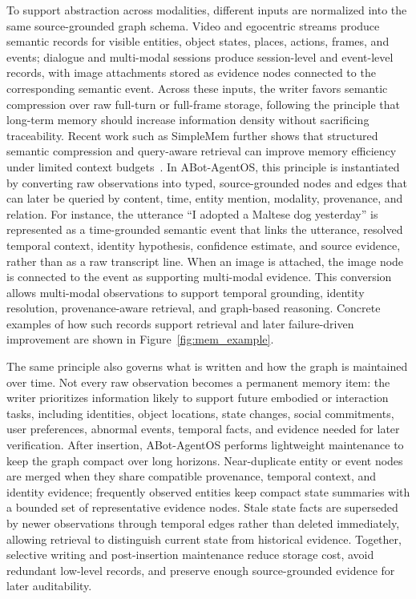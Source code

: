 To support abstraction across modalities, different inputs are normalized into the same source-grounded graph schema.
Video and egocentric streams produce semantic records for visible entities, object states, places, actions, frames, and events; dialogue and multi-modal sessions produce session-level and event-level records, with image attachments stored as evidence nodes connected to the corresponding semantic event.
Across these inputs, the writer favors semantic compression over raw full-turn or full-frame storage, following the principle that long-term memory should increase information density without sacrificing traceability.
Recent work such as SimpleMem further shows that structured semantic compression and query-aware retrieval can improve memory efficiency under limited context budgets~\cite{simplemem}.
In ABot-AgentOS, this principle is instantiated by converting raw observations into typed, source-grounded nodes and edges that can later be queried by content, time, entity mention, modality, provenance, and relation.
For instance, the utterance ``I adopted a Maltese dog yesterday'' is represented as a time-grounded semantic event that links the utterance, resolved temporal context, identity hypothesis, confidence estimate, and source evidence, rather than as a raw transcript line.
When an image is attached, the image node is connected to the event as supporting multi-modal evidence.
This conversion allows multi-modal observations to support temporal grounding, identity resolution, provenance-aware retrieval, and graph-based reasoning.
Concrete examples of how such records support retrieval and later failure-driven improvement are shown in Figure~\ref{fig:mem_example}.

The same principle also governs what is written and how the graph is maintained over time.
Not every raw observation becomes a permanent memory item: the writer prioritizes information likely to support future embodied or interaction tasks, including identities, object locations, state changes, social commitments, user preferences, abnormal events, temporal facts, and evidence needed for later verification.
After insertion, ABot-AgentOS performs lightweight maintenance to keep the graph compact over long horizons.
Near-duplicate entity or event nodes are merged when they share compatible provenance, temporal context, and identity evidence; frequently observed entities keep compact state summaries with a bounded set of representative evidence nodes.
Stale state facts are superseded by newer observations through temporal edges rather than deleted immediately, allowing retrieval to distinguish current state from historical evidence.
Together, selective writing and post-insertion maintenance reduce storage cost, avoid redundant low-level records, and preserve enough source-grounded evidence for later auditability.



